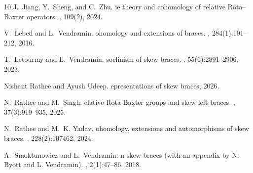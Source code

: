 \documentclass{jonasart}
\theoremstyle{plain}
\begin{document}
{\begin{thebibliography}{10}
        J.~{J}iang, Y.~{S}heng, and C.~{Z}hu.
        ie theory and cohomology of relative {R}ota--{B}axter operators.
        , 109(2),
        2024.
        
        V.~{L}ebed and L.~{V}endramin.
        ohomology and extensions of braces.
        , 284(1):191–212, 2016.
        
        T.~{L}etourmy and L.~{V}endramin.
        soclinism of skew braces.
        ,
        55(6):2891–2906, 2023.
        
        {N}ishant {R}athee and {A}yush {U}deep.
        epresentations of skew braces, 2026.
        
        N.~{R}athee and M.~{S}ingh.
        elative {R}ota-{B}axter groups and skew left braces.
        , 37(3):919--935, 2025.
        
        N.~{R}athee and M.~K. {Y}adav.
        ohomology, extensions and automorphisms of skew braces.
        , 228(2):107462,
        2024.
        
        A.~{S}moktunowicz and L.~{V}endramin.
        n skew braces (with an appendix by {N}. {B}yott and {L}.
        {V}endramin).
        , 2(1):47–86, 2018.
    \end{thebibliography}
    }
	
\end{document}
